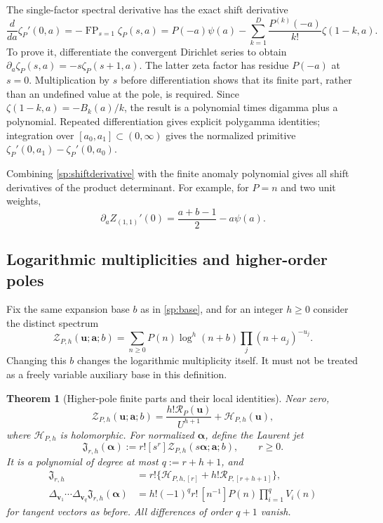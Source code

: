 \documentclass[11pt,letterpaper]{article}
\numberwithin{equation}{section}
\theoremstyle{plain}
\newtheorem{theorem}{Theorem}[section]
\theoremstyle{definition}
\theoremstyle{remark}
\DeclareMathOperator{\FP}{FP}
\newcommand{\cZ}{\mathcal Z}
\newcommand{\cH}{\mathcal H}
\newcommand{\cR}{\mathcal R}
\begin{document}
The single-factor spectral derivative has the exact shift derivative
\begin{equation}\label{sp:shiftderivative}
 \frac{d}{da}\zeta_P'(0,a)
  =-\FP_{s=1}\zeta_P(s,a)
  =P(-a)\psi(a)
      -\sum_{k=1}^D\frac{P^{(k)}(-a)}{k!}\zeta(1-k,a).
\end{equation}
To prove it, differentiate the convergent Dirichlet series to obtain
$\partial_a\zeta_P(s,a)=-s\zeta_P(s+1,a)$. The latter zeta factor
has residue $P(-a)$ at $s=0$. Multiplication by $s$ before
differentiation shows that its finite part, rather than an undefined
value at the pole, is required. Since
$\zeta(1-k,a)=-B_k(a)/k$, the result is a polynomial times digamma
plus a polynomial. Repeated differentiation gives explicit polygamma
identities; integration over $[a_0,a_1]\subset(0,\infty)$ gives the
normalized primitive $\zeta_P'(0,a_1)-\zeta_P'(0,a_0)$.

Combining \eqref{sp:shiftderivative} with the finite anomaly polynomial
gives all shift derivatives of the product determinant. For example,
for $P=n$ and two unit weights,
\[
 \partial_a Z_{(1,1)}'(0)=\frac{a+b-1}2-a\psi(a).
\]

\subsection{Logarithmic multiplicities and higher-order poles}

Fix the same expansion base $b$ as in \eqref{sp:base}, and for an
integer $h\ge0$ consider the distinct spectrum
\begin{equation}\label{sp:logdef}
 \cZ_{P,h}(\boldsymbol u;\boldsymbol a;b)
  =\sum_{n\ge0}P(n)\log^h(n+b)\prod_j(n+a_j)^{-u_j}.
\end{equation}
Changing this $b$ changes the logarithmic multiplicity itself.
It must not be treated as a freely variable auxiliary base in this
definition.

\begin{theorem}[Higher-pole finite parts and their local identities]
\label{sp:thm:log}
Near zero,
\begin{equation}\label{sp:loggerm}
 \cZ_{P,h}(\boldsymbol u;\boldsymbol a;b)
   =\frac{h!\cR_P(\boldsymbol u)}{U^{h+1}}
                                +\cH_{P,h}(\boldsymbol u),
\end{equation}
where $\cH_{P,h}$ is holomorphic. For normalized $\boldsymbol\alpha$,
define the Laurent jet
\begin{equation}\label{sp:logjet}
 \mathfrak J_{r,h}(\boldsymbol\alpha)
  :=r![s^r]\cZ_{P,h}(s\boldsymbol\alpha;\boldsymbol a;b),
 \qquad r\ge0.
\end{equation}
It is a polynomial of degree at most $q:=r+h+1$, and
\begin{align}
 \mathfrak J_{r,h}
   &=r!\{\cH_{P,h,[r]}+h!\cR_{P,[r+h+1]}\},\label{sp:loghomogeneous}\\
 \Delta_{\boldsymbol v_1}\cdots\Delta_{\boldsymbol v_q}
       \mathfrak J_{r,h}(\boldsymbol\alpha)
   &=h!(-1)^q r!\,[n^{-1}]P(n)\prod_{i=1}^q V_i(n)
 \label{sp:logdifference}
\end{align}
for tangent vectors as before. All differences of order $q+1$ vanish.
\end{theorem}
\end{document}
